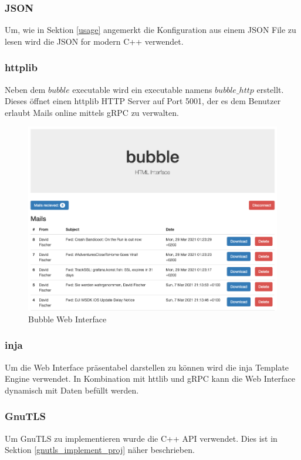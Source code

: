 \documentclass[12pt, letterpaper]{article}
\begin{document}
\subsubsection{JSON}
Um, wie in Sektion \ref{usage} angemerkt die Konfiguration aus einem JSON File zu lesen wird die JSON for modern C++\cite{json_ref} verwendet.

\subsubsection{httplib}
Neben dem $bubble$ executable wird ein executable namens $bubble\_http$ erstellt. Dieses öffnet einen httplib\cite{httplib-ref} HTTP Server auf Port 5001, der es dem Benutzer erlaubt Mails online mittels gRPC zu verwalten.

\begin{figure}[H]
  \centering
  \includegraphics[width=1\textwidth]{web_interface.png}
  \caption{Bubble Web Interface}
  \label{fig:bubble_web_interface}
\end{figure}

\subsubsection{inja}
Um die Web Interface präsentabel darstellen zu können wird die inja Template Engine\cite{inja-ref} verwendet. In Kombination mit httlib und gRPC kann die Web Interface dynamisch mit Daten befüllt werden.

\subsubsection{GnuTLS}
Um GnuTLS zu implementieren wurde die C++ API verwendet\cite{gnutls_cpp}. Dies ist in Sektion \ref{gnutls_implement_proj} näher beschrieben.
\end{document}
